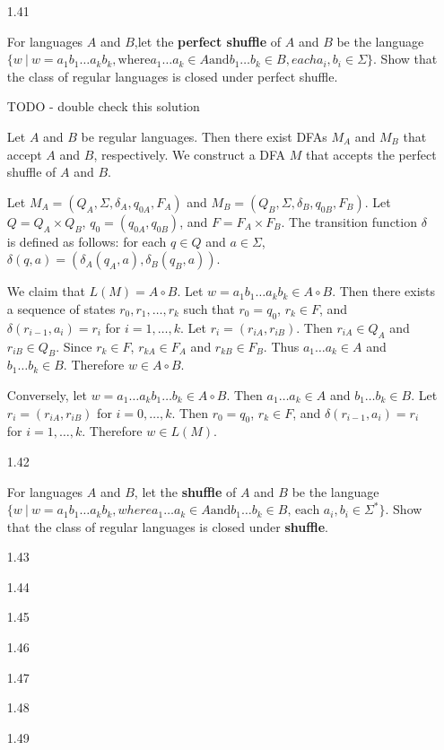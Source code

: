 \begin{enumerate}

    \item [1.41]

          For languages $A$ and $B$,let the \textbf{perfect shuffle} of $A$ and $B$ be the language $\{w~|~ w = a_1b_1\ldots a_kb_k , \text{where} a_1\ldots a_k \in A \text{and} b_1 \ldots b_k \in B, each a_i,b_i \in \Sigma\}$. Show that the class of regular languages is closed under perfect shuffle.

          TODO - double check this solution

          Let $A$ and $B$ be regular languages. Then there exist DFAs $M_A$ and $M_B$ that accept $A$ and $B$, respectively. We construct a DFA $M$ that accepts the perfect shuffle of $A$ and $B$.

          Let $M_A = (Q_A,\Sigma,\delta_A,q_{0A},F_A)$ and $M_B = (Q_B,\Sigma,\delta_B,q_{0B},F_B)$. Let $Q = Q_A \times Q_B$, $q_0 = (q_{0A},q_{0B})$, and $F = F_A \times F_B$. The transition function $\delta$ is defined as follows: for each $q \in Q$ and $a \in \Sigma$, $\delta(q,a) = (\delta_A(q_A,a),\delta_B(q_B,a))$.

          We claim that $L(M) = A \circ B$. Let $w = a_1b_1\ldots a_kb_k \in A \circ B$. Then there exists a sequence of states $r_0,r_1,\ldots,r_k$ such that $r_0 = q_0$, $r_k \in F$, and $\delta(r_{i-1},a_i) = r_i$ for $i = 1,\ldots,k$. Let $r_i = (r_{iA},r_{iB})$. Then $r_{iA} \in Q_A$ and $r_{iB} \in Q_B$. Since $r_k \in F$, $r_{kA} \in F_A$ and $r_{kB} \in F_B$. Thus $a_1\ldots a_k \in A$ and $b_1\ldots b_k \in B$. Therefore $w \in A \circ B$.

          Conversely, let $w = a_1\ldots a_kb_1\ldots b_k \in A \circ B$. Then $a_1\ldots a_k \in A$ and $b_1\ldots b_k \in B$. Let $r_i = (r_{iA},r_{iB})$ for $i = 0,\ldots,k$. Then $r_0 = q_0$, $r_k \in F$, and $\delta(r_{i-1},a_i) = r_i$ for $i = 1,\ldots,k$. Therefore $w \in L(M)$.


    \item [1.42]

    For languages $A$ and $B$, let the \textbf{shuffle} of $A$ and $B$ be the language $\{w~|~ w = a_1b_1\ldots a_kb_k, where a_1 \ldots a_k \in A \text{and} b_1 \ldots b_k \in B\text{, each }a_i,b_i \in \Sigma^\ast\}$. Show that the class of regular languages is closed under \textbf{shuffle}.  

    \item [1.43]
    \item [1.44]
    \item [1.45]
    \item [1.46]
    \item [1.47]
    \item [1.48]
    \item [1.49]

\end{enumerate}
